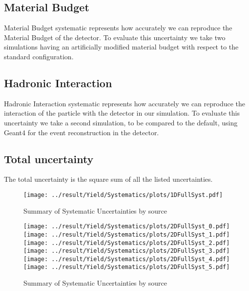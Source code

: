 \subsection{Material Budget}
Material Budget systematic represents how accurately we can reproduce the Material Budget of the detector. To evaluate this uncertainty we take two simulations having an artificially modified material budget with respect to the standard configuration.
\begin{comment}
In particular we will use \hl{... XYZ ...} productions. Those productions are made in p-Pb and have -7\% and +14\% of material budget. The uncertainty is evaluated taking the half of the fractiona variation between the efficiencies $\times$ acceptance in the two simulations. This procedure can be done as the material budget is strictly related to the detector structure and does not depend on the energy and/or collision system.
\end{comment}

\subsection{Hadronic Interaction}
Hadronic Interaction systematic represents how accurately we can reproduce the interaction of the particle with the detector in our simulation. To evaluate this uncertainty we take a second simulation, to be compared to the default, using Geant4 for the event reconstruction in the detector.

\subsection{Total uncertainty}
The total uncertainty is the square sum of all the listed uncertainties.

\newpage
\begin{figure}
	\centering
		\texttt{[image: ../result/Yield/Systematics/plots/1DFullSyst.pdf]}
		\caption{Summary of Systematic Uncertainties by source}
		\label{}
\end{figure}

\begin{figure}
	\centering
		\texttt{[image: ../result/Yield/Systematics/plots/2DFullSyst\_0.pdf]}
		\texttt{[image: ../result/Yield/Systematics/plots/2DFullSyst\_1.pdf]}\\
		\texttt{[image: ../result/Yield/Systematics/plots/2DFullSyst\_2.pdf]}
		\texttt{[image: ../result/Yield/Systematics/plots/2DFullSyst\_3.pdf]}\\
		\texttt{[image: ../result/Yield/Systematics/plots/2DFullSyst\_4.pdf]}
		\texttt{[image: ../result/Yield/Systematics/plots/2DFullSyst\_5.pdf]}
		\caption{Summary of Systematic Uncertainties by source}
		\label{}
\end{figure}

